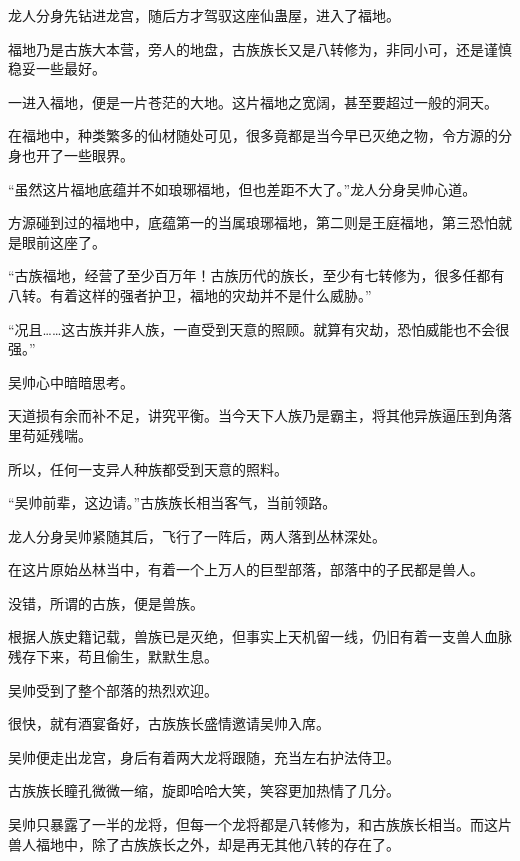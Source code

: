 
\begin{this_body}



龙人分身先钻进龙宫，随后方才驾驭这座仙蛊屋，进入了福地。

福地乃是古族大本营，旁人的地盘，古族族长又是八转修为，非同小可，还是谨慎稳妥一些最好。

一进入福地，便是一片苍茫的大地。这片福地之宽阔，甚至要超过一般的洞天。

在福地中，种类繁多的仙材随处可见，很多竟都是当今早已灭绝之物，令方源的分身也开了一些眼界。

“虽然这片福地底蕴并不如琅琊福地，但也差距不大了。”龙人分身吴帅心道。

方源碰到过的福地中，底蕴第一的当属琅琊福地，第二则是王庭福地，第三恐怕就是眼前这座了。

“古族福地，经营了至少百万年！古族历代的族长，至少有七转修为，很多任都有八转。有着这样的强者护卫，福地的灾劫并不是什么威胁。”

“况且……这古族并非人族，一直受到天意的照顾。就算有灾劫，恐怕威能也不会很强。”

吴帅心中暗暗思考。

天道损有余而补不足，讲究平衡。当今天下人族乃是霸主，将其他异族逼压到角落里苟延残喘。

所以，任何一支异人种族都受到天意的照料。

“吴帅前辈，这边请。”古族族长相当客气，当前领路。

龙人分身吴帅紧随其后，飞行了一阵后，两人落到丛林深处。

在这片原始丛林当中，有着一个上万人的巨型部落，部落中的子民都是兽人。

没错，所谓的古族，便是兽族。

根据人族史籍记载，兽族已是灭绝，但事实上天机留一线，仍旧有着一支兽人血脉残存下来，苟且偷生，默默生息。

吴帅受到了整个部落的热烈欢迎。

很快，就有酒宴备好，古族族长盛情邀请吴帅入席。

吴帅便走出龙宫，身后有着两大龙将跟随，充当左右护法侍卫。

古族族长瞳孔微微一缩，旋即哈哈大笑，笑容更加热情了几分。

吴帅只暴露了一半的龙将，但每一个龙将都是八转修为，和古族族长相当。而这片兽人福地中，除了古族族长之外，却是再无其他八转的存在了。


\end{this_body}
